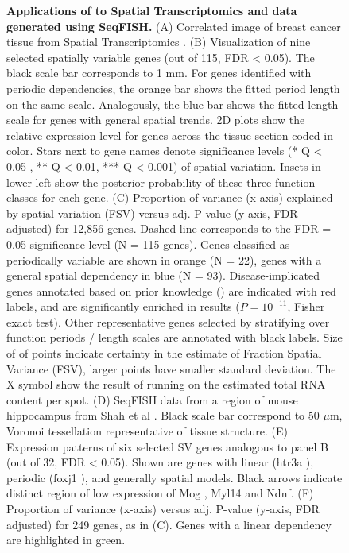 \begin{figure}
    \caption[Applications of  to Spatial Transcriptomics and data generated using SeqFISH]{\textbf{Applications of  to Spatial Transcriptomics and data generated using SeqFISH.} (A) Correlated image of breast cancer tissue from Spatial Transcriptomics \cite{Stahl2016-ym}. (B) Visualization of nine selected spatially variable genes (out of 115, FDR < 0.05). The black scale bar corresponds to 1 mm. For genes identified with periodic dependencies, the orange bar shows the fitted period length on the same scale. Analogously, the blue bar shows the fitted length scale for genes with general spatial trends. 2D plots show the relative expression level for genes across the tissue section coded in color. Stars next to gene names denote significance levels (* Q < 0.05 , ** Q < 0.01, *** Q < 0.001) of spatial variation. Insets in lower left show the posterior probability of these three function classes for each gene. (C) Proportion of variance (x-axis) explained by spatial variation (FSV) versus adj. P-value (y-axis, FDR adjusted) for 12,856 genes. Dashed line corresponds to the FDR = 0.05 significance level (N = 115 genes). Genes classified as periodically variable are shown in orange (N = 22), genes with a general spatial dependency in blue (N = 93). Disease-implicated genes annotated based on prior knowledge (\cite{Stahl2016-ym}) are indicated with red labels, and are significantly enriched in  results (\( P = 10^{-11} \), Fisher exact test). Other representative genes selected by stratifying over function periods / length scales are annotated with black labels. Size of of points indicate certainty in the estimate of Fraction Spatial Variance (FSV), larger points have smaller standard deviation. The X symbol show the result of running  on the estimated total RNA content per spot. (D) SeqFISH data from a region of mouse hippocampus from Shah et al \cite{Shah2016-bi}. Black scale bar correspond to 50 \( \mu \)m, Voronoi tessellation representative of tissue structure. (E) Expression patterns of six selected SV genes analogous to panel B (out of 32, FDR < 0.05). Shown are genes with linear (htr3a ), periodic (foxj1 ), and generally spatial models. Black arrows indicate distinct region of low expression of  Mog ,  Myl14  and  Ndnf. (F) Proportion of variance (x-axis) versus adj. P-value (y-axis, FDR adjusted) for 249 genes, as in (C). Genes with a linear dependency are highlighted in green.}
    \label{fig:spatialresult}
\end{figure}

